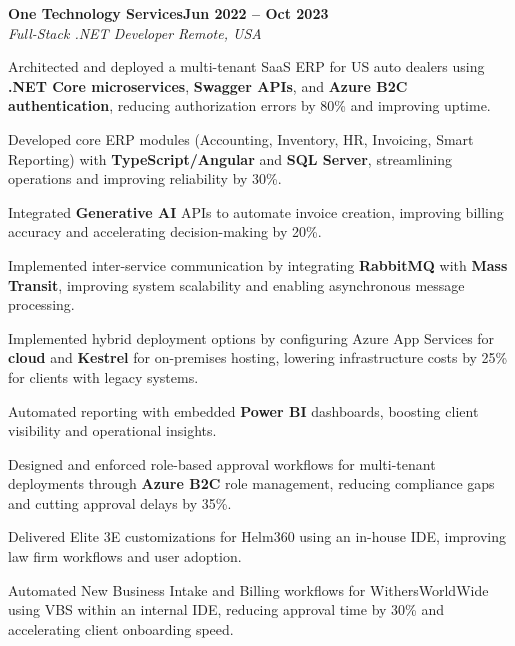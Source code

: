 \documentclass[letterpaper,10pt]{article}
\newcommand{\headingBf}[2]{
  \hspace{10pt}\textbf{#1}\hfill\textbf{#2}\\
}
\newcommand{\headingIt}[2]{
  \hspace{10pt}\textit{#1}\hfill\textit{#2}\\
}
\newenvironment{resume_list}{
  \vspace{-7pt}
  \begin{itemize}[itemsep=-2px, parsep=1pt, leftmargin=30pt]
}{
  \end{itemize}
}
\begin{document}
\headingBf{One Technology Services}{Jun 2022 -- Oct 2023}
\headingIt{Full-Stack .NET Developer \hfill Remote, USA}{}
\begin{resume_list}
    \item Architected and deployed a multi-tenant SaaS ERP for US auto dealers using \textbf{.NET Core microservices}, \textbf{Swagger APIs}, and \textbf{Azure B2C authentication}, reducing authorization errors by 80\% and improving uptime.
    \item Developed core ERP modules (Accounting, Inventory, HR, Invoicing, Smart Reporting) with \textbf{TypeScript/Angular} and \textbf{SQL Server}, streamlining operations and improving reliability by 30\%.
    \item Integrated \textbf{Generative AI} APIs to automate invoice creation, improving billing accuracy and accelerating decision-making by 20\%.
    \item Implemented inter-service communication by integrating \textbf{RabbitMQ} with \textbf{Mass Transit}, improving system scalability and enabling asynchronous message processing.
    \item Implemented hybrid deployment options by configuring Azure App Services for \textbf{cloud} and \textbf{Kestrel} for on-premises hosting, lowering infrastructure costs by 25\% for clients with legacy systems.
    \item Automated reporting with embedded \textbf{Power BI} dashboards, boosting client visibility and operational insights.   
    \item Designed and enforced role-based approval workflows for multi-tenant deployments through \textbf{Azure B2C} role management, reducing compliance gaps and cutting approval delays by 35\%.
    \item Delivered Elite 3E customizations for Helm360 using an in-house IDE, improving law firm workflows and user adoption.
    \item Automated New Business Intake and Billing workflows for WithersWorldWide using VBS within an internal IDE, reducing approval time by 30\% and accelerating client onboarding speed.
\end{resume_list}
\end{document}
